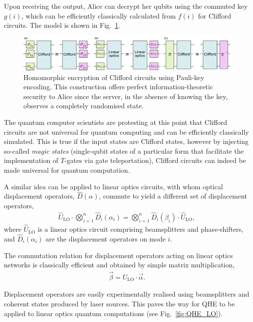 Upon receiving the output, Alice can decrypt her qubits using the commuted key $g(i)$, which can be efficiently classically calculated from $f(i)$ for Clifford circuits. The model is shown in Fig.~\ref{fig:QHE_Clifford}.

\begin{figure}[!htb]
	\centering
	\includegraphics[width=\columnwidth]{figures/Clifford_QHE}
	\caption{Homomorphic encryption of Clifford circuits using Pauli-key encoding. This construction offers perfect information-theoretic security to Alice since the server, in the absence of knowing the key, observes a completely randomised state.} \label{fig:QHE_Clifford}
\end{figure}

The quantum computer scientists are protesting at this point that Clifford circuits are not universal for quantum computing and can be efficiently classically simulated. This is true if the input states are Clifford states, however by injecting so-called \emph{magic states} (single-qubit states of a particular form that facilitate the implementation of $T$-gates via gate teleportation), Clifford circuits can indeed be made universal for quantum computation.

A similar idea can be applied to linear optics circuits, with whom optical displacement operators, $\hat{D}(\alpha)$, commute to yield a different set of displacement operators,
\begin{align}
	\hat{U}_\mathrm{LO} \cdot \bigotimes_{i=1}^n \hat{D}_i(\alpha_i) = \bigotimes_{i=1}^n \hat{D}_i(\beta_i) \cdot \hat{U}_\mathrm{LO},
\end{align}
where $\hat{U}_\mathrm{LO}$ is a linear optics circuit comprising beamsplitters and phase-shifters, and $\hat{D}_i(\alpha_i)$ are the displacement operators on mode $i$.

The commutation relation for displacement operators acting on linear optics networks is classically efficient and obtained by simple matrix multiplication,
\begin{align}
	\vec\beta = U_\mathrm{LO}\cdot\vec\alpha.	
\end{align}

Displacement operators are easily experimentally realised using beamsplitters and coherent states produced by laser sources. This paves the way for QHE to be applied to linear optics quantum computations \cite{bib:KLM01} (see Fig.~\ref{fig:QHE_LO}).

